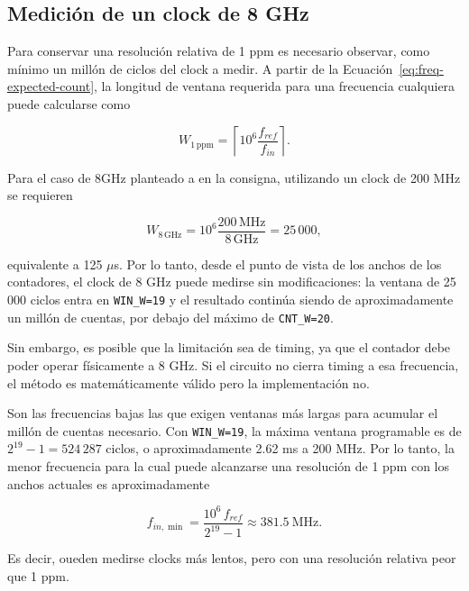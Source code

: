 \documentclass[10pt,a4paper]{article}
\begin{document}
\subsection{Medición de un clock de 8 GHz}

Para conservar una resolución relativa de 1 ppm es necesario observar, como mínimo un 
millón de ciclos del clock a medir. A partir de la Ecuación~\ref{eq:freq-expected-count}, 
la longitud de ventana requerida para una frecuencia cualquiera puede calcularse como

\begin{equation}
    W_{1\,\mathrm{ppm}}
    =\left\lceil 10^6\frac{f_{ref}}{f_{in}}\right\rceil.
    \label{eq:freq-window-one-ppm}
\end{equation}

Para el caso de 8GHz planteado a en la consigna, utilizando un clock
de 200 MHz se requieren

\begin{equation}
    W_{8\,\mathrm{GHz}}
    =10^6\frac{200\,\mathrm{MHz}}{8\,\mathrm{GHz}}
    =25\,000,
    \label{eq:freq-window-8ghz}
\end{equation}

equivalente a 125 $\mu$s. Por lo tanto, desde el punto de vista de los anchos de los
contadores, el clock de 8 GHz puede medirse sin modificaciones: la ventana de 25 000
ciclos entra en \texttt{WIN\_W=19} y el resultado continúa siendo de aproximadamente
un millón de cuentas, por debajo del máximo de \texttt{CNT\_W=20}.

Sin embargo, es posible que la limitación sea de timing, ya que el contador debe 
poder operar físicamente a 8 GHz. Si el circuito no cierra timing a esa frecuencia, 
el método es matemáticamente válido pero la implementación no.

Son las frecuencias bajas las que exigen ventanas más largas para acumular el millón 
de cuentas necesario. Con \texttt{WIN\_W=19}, la máxima ventana programable es de 
$2^{19}-1=524\,287$ ciclos, o aproximadamente 2.62 ms a 200 MHz. Por lo tanto,
la menor frecuencia para la cual puede alcanzarse una resolución de 1 ppm con los
anchos actuales es aproximadamente

\begin{equation}
    f_{in,\min}
    =\frac{10^6\,f_{ref}}{2^{19}-1}
    \approx 381.5\ \mathrm{MHz}.
    \label{eq:freq-min-one-ppm}
\end{equation}

Es decir, oueden medirse clocks más lentos, pero con una resolución relativa peor 
que 1 ppm.
\end{document}
